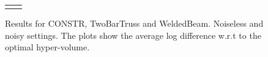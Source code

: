 \documentclass[review,preprint,12pt]{elsarticle}
\begin{document}
\begin{figure}[H]
\begin{tabular}{cc}
		\vspace{-.1cm}
	\end{tabular}
        \caption{Results for CONSTR, TwoBarTruss and WeldedBeam. Noiseless 
		and noisy settings. The plots show the average log difference w.r.t to the optimal hyper-volume.}
        \label{fig:benchmark_results_2}
\end{figure}

%
\end{document}

